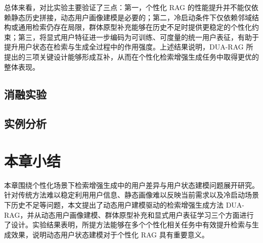 总体来看，对比实验主要验证了三点：第一，个性化 RAG 的性能提升并不能仅依赖静态历史拼接，动态用户画像建模是必要的；第二，冷启动条件下仅依赖邻域结构或通用检索仍存在局限，群体原型补充能够在历史不足时提供更稳定的个性化约束；第三，将显式用户特征进一步编码为可训练、可度量的统一用户表征，有助于提升用户状态在检索与生成全过程中的作用强度。上述结果说明，DUA-RAG 所提出的三项关键设计能够形成互补，从而在个性化检索增强生成任务中取得更优的整体表现。

\subsection{消融实验}

\subsection{实例分析}

\section{本章小结}

本章围绕个性化场景下检索增强生成中的用户差异与用户状态建模问题展开研究。针对传统方法难以稳定利用用户信息、静态画像难以反映当前需求以及冷启动场景下历史不足等问题，本文提出了动态用户建模驱动的检索增强生成方法 DUA-RAG，并从动态用户画像建模、群体原型补充和显式用户表征学习三个方面进行了设计。实验结果表明，所提方法能够在多个个性化相关任务中有效提升检索与生成效果，说明动态用户状态建模对于个性化 RAG 具有重要意义。